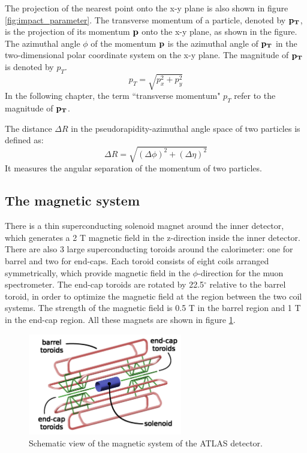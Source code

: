 The projection of the nearest point onto the x-y plane is also shown in figure \ref{fig:impact_parameter}.
The transverse momentum of a particle, denoted by $\bf{p}_T$, is the projection of its momentum $\bf{p}$ onto the x-y plane, as shown in the figure.
The azimuthal angle $\phi$ of the momentum $\bf{p}$ is the azimuthal angle of $\bf{p}_T$ in the two-dimensional polar coordinate system on the x-y plane.
The magnitude of $\bf{p}_T$ is denoted by $p_T$.
\begin{equation}
p_T = \sqrt{p_x^2 + p_y^2}
\end{equation}
In the following chapter, the term ``transverse momentum" $p_T$ refer to the magnitude of $\bf{p}_T$.

The distance $\Delta R$ in the pseudorapidity-azimuthal angle space of two particles is defined as:
\begin{equation}
\Delta R = \sqrt{(\Delta \phi) ^2 + (\Delta \eta) ^2}
\end{equation}
It measures the angular separation of the momentum of two particles.

\subsection{The magnetic system}
\label{sec:magnetic_system}
There is a thin superconducting solenoid magnet around the inner detector, which generates a 2 T magnetic field in the z-direction inside the inner detector.
There are also 3 large superconducting toroids around the calorimeter: one for barrel and two for end-caps.
Each toroid consists of eight coils arranged symmetrically, which provide magnetic field in the $\phi$-direction for the muon spectrometer.
The end-cap toroids are rotated by 22.5$^{\circ}$ relative to the barrel toroid, in order to optimize the magnetic field at the region between the two coil systems.
The strength of the magnetic field is 0.5 T in the barrel region and 1 T in the end-cap region.
All these magnets are shown in figure \ref{fig:magnetic_system}.

\begin{figure}
\centering
\includegraphics[width=0.6\textwidth]{data/photo/detector/magnet.png}
\caption{Schematic view of the magnetic system of the ATLAS detector. \cite{magnetic_system}}
\label{fig:magnetic_system}
\end{figure}

